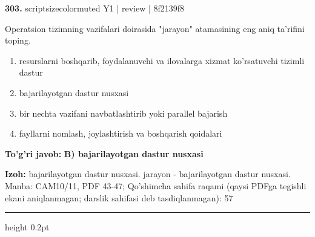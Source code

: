 \documentclass[10pt,a4paper]{article}
\begin{document}
{\bfseries\sffamily\color{ink} 303.} {scriptsizecolor{muted} Y1 | review | 8f2139f8}
\par
Operatsion tizimning vazifalari doirasida "jarayon" atamasining eng aniq ta'rifini toping.
\begin{enumerate}[label=\Alph*),leftmargin=9mm]
\item resurslarni boshqarib, foydalanuvchi va ilovalarga xizmat ko'rsatuvchi tizimli dastur
\item bajarilayotgan dastur nusxasi
\item bir nechta vazifani navbatlashtirib yoki parallel bajarish
\item fayllarni nomlash, joylashtirish va boshqarish qoidalari
\end{enumerate}
\begin{tcolorbox}[enhanced,breakable,colback=teal!4,colframe=teal!60!black,boxrule=0.45pt,arc=1.2mm,left=2.7mm,right=2.7mm,top=1.8mm,bottom=1.8mm,before skip=2mm,after skip=2mm]
{\bfseries\sffamily\color{teal}To'g'ri javob:} \textbf{B) bajarilayotgan dastur nusxasi}
\par\smallskip
{\bfseries Izoh:} bajarilayotgan dastur nusxasi. jarayon - bajarilayotgan dastur nusxasi. Manba: CAM10/11, PDF 43-47; Qo'shimcha sahifa raqami (qaysi PDFga tegishli ekani aniqlanmagan; darslik sahifasi deb tasdiqlanmagan): 57
\end{tcolorbox}
\vspace{2mm}\hrule height 0.2pt\vspace{3mm}
\end{document}
